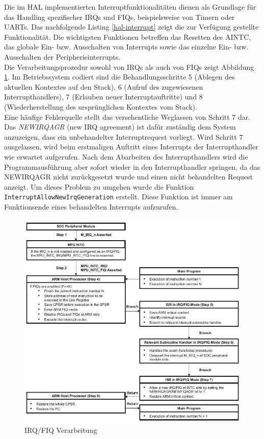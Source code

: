 Die im \ac{HAL} implementierten Interruptfunktionalitäten dienen als Grundlage für das Handling spezifischer IRQs und FIQs, beispielsweise von Timern oder \ac{UART}s. Das nachfolgende Listing \ref{hal-interrupt} zeigt die zur Verfügung gestellte Funktionalität. Die wichtigsten Funktionen betreffen das Resetten des \ac{AINTC}, das globale Ein- bzw. Ausschalten von Interrupts sowie das einzelne Ein- bzw. Ausschalten der Peripherieinterrupts.\\



Die Verarbeitungsprozedur sowohl von IRQs als auch von FIQs zeigt Abbildung \ref{fig:interruptProcedure}. Im Betriebssystem codiert sind die Behandlungsschritte 5 (Ablegen des aktuellen Kontextes auf den Stack), 6 (Aufruf des zugewiesenen Interrupthandlers), 7 (Erlauben neuer Interruptauftritte) und 8 (Wiederherstellung des ursprünglichen Kontextes vom Stack).\\

Eine häufige Fehlerquelle stellt das versehentliche Weglassen von Schritt 7 dar. Das \textit{NEWIRQAGR} (new IRQ agreement) ist dafür zuständig dem System anzuzeigen, dass ein unbehandelter Interruptrequest vorliegt. Wird Schritt 7 ausgelassen, wird beim erstmaligen Auftritt eines Interrupts der Interrupthandler wie erwartet aufgerufen. Nach dem Abarbeiten des Interrupthandlers wird die Programmausführung aber sofort wieder in den Interrupthandler springen, da das NEWIRQAGR nicht zurückgesetzt wurde und einen nicht behandelten Request anzeigt. Um dieses Problem zu umgehen wurde die Funktion
\texttt{InterruptAllowNew\-IrqGeneration} erstellt. Diese Funktion ist immer am Funktionsende eines behandelten Interrupts aufzurufen.

\begin{figure}[H]
	\includegraphics[scale=1]{chapters/hal/figures/interruptProcedure}
	\caption{IRQ/FIQ Verarbeitung \cite[S. 193]{ARM:TRM}}
	\label{fig:interruptProcedure}
\end{figure}


